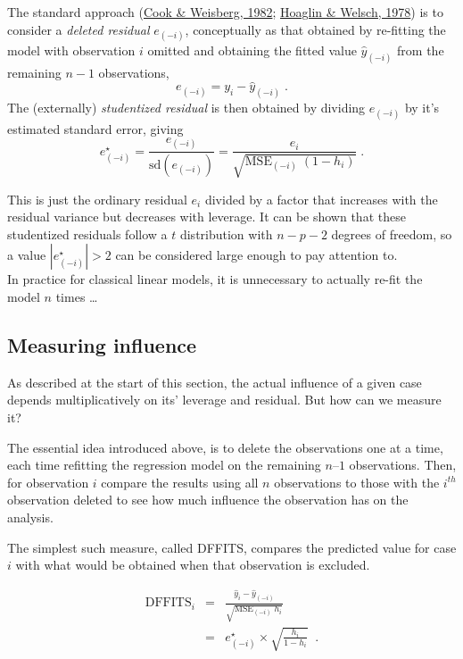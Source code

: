 \documentclass[
  letterpaper,
  10pt,
  krantz2]{krantz}
\begin{document}
The standard approach (\protect\hyperlink{ref-CookWeisberg:82}{Cook \&
Weisberg, 1982}; \protect\hyperlink{ref-HoaglinWelsch1978}{Hoaglin \&
Welsch, 1978}) is to consider a \emph{deleted residual} \(e_{(-i)}\),
conceptually as that obtained by re-fitting the model with observation
\(i\) omitted and obtaining the fitted value \(\hat{y}_{(-i)}\) from the
remaining \(n-1\) observations, \[
e_{(-i)} = y_i - \hat{y}_{(-i)} \; .
\] The (externally) \emph{studentized residual} is then obtained by
dividing \(e_{(-i)}\) by it's estimated standard error, giving \[
e^\star_{(-i)} = \frac{e_{(-i)}}{\text{sd}(e_{(-i)})} = \frac{e_i}{\sqrt{\text{MSE}_{(-i)}\; (1 - h_i)}} \; .
\]

This is just the ordinary residual \(e_i\) divided by a factor that
increases with the residual variance but decreases with leverage. It can
be shown that these studentized residuals follow a \(t\) distribution
with \(n - p -2\) degrees of freedom, so a value
\(|e^\star_{(-i)}| > 2\) can be considered large enough to pay attention
to.\\
In practice for classical linear models, it is unnecessary to actually
re-fit the model \(n\) times \ldots{}

\hypertarget{measuring-influence}{%
\subsection{Measuring influence}\label{measuring-influence}}

As described at the start of this section, the actual influence of a
given case depends multiplicatively on its' leverage and residual. But
how can we measure it?

The essential idea introduced above, is to delete the observations one
at a time, each time refitting the regression model on the remaining
\(n–1\) observations. Then, for observation \(i\) compare the results
using all \(n\) observations to those with the \(i^{th}\) observation
deleted to see how much influence the observation has on the analysis.

The simplest such measure, called DFFITS, compares the predicted value
for case \(i\) with what would be obtained when that observation is
excluded.

\begin{eqnarray*}
\text{DFFITS}_i & = & \frac{\hat{y}_i - \hat{y}_{(-i)}}{\sqrt{\text{MSE}_{(-i)}\; h_i}} \\
   & = & e^\star_{(-i)} \times \sqrt{\frac{h_i}{1-h_i}} \;\; .
\end{eqnarray*}
\end{document}
